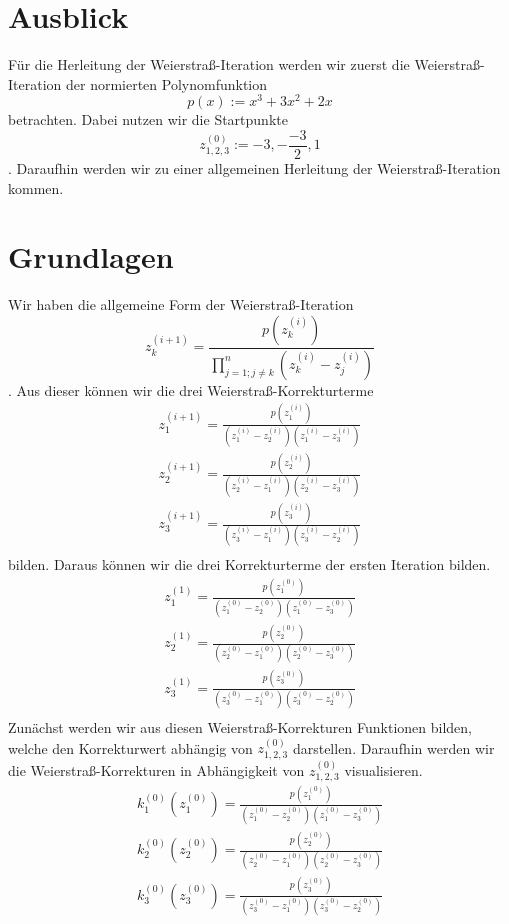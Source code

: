 \documentclass[12pt]{article}
\begin{document}
\section*{Ausblick}
Für die Herleitung der Weierstraß-Iteration werden wir zuerst die Weierstraß-Iteration der normierten Polynomfunktion
\begin{equation}
  p(x) := x^3+3x^2+2x
\end{equation}
betrachten. Dabei nutzen wir die Startpunkte
\begin{equation}
  z^{(0)}_{1,2,3} := -3, -\frac{-3}{2}, 1
\end{equation}
. Daraufhin werden wir zu einer allgemeinen Herleitung der Weierstraß-Iteration kommen.

\section*{Grundlagen}
Wir haben die allgemeine Form der Weierstraß-Iteration
\begin{equation}
  z_k^{(i+1)} = \frac{p(z_{k}^{(i)})}{\prod_{j=1;j\neq k}^{n}(z_{k}^{(i)}-z_j^{(i)})}
\end{equation}
. Aus dieser können wir die drei Weierstraß-Korrekturterme
\begin{align*}
  z_1^{(i+1)} = \frac{p(z_1^{(i)})}{(z_1^{(i)}-z_2^{(i)})(z_1^{(i)}-z_3^{(i)})}\\
  z_2^{(i+1)} = \frac{p(z_2^{(i)})}{(z_2^{(i)}-z_1^{(i)})(z_2^{(i)}-z_3^{(i)})}\\
  z_3^{(i+1)} = \frac{p(z_3^{(i)})}{(z_3^{(i)}-z_1^{(i)})(z_3^{(i)}-z_2^{(i)})}\\
\end{align*}
bilden. Daraus können wir die drei Korrekturterme der ersten Iteration bilden.
\begin{align*}
  z_1^{(1)} = \frac{p(z_1^{(0)})}{(z_1^{(0)}-z_2^{(0)})(z_1^{(0)}-z_3^{(0)})}\\
  z_2^{(1)} = \frac{p(z_2^{(0)})}{(z_2^{(0)}-z_1^{(0)})(z_2^{(0)}-z_3^{(0)})}\\
  z_3^{(1)} = \frac{p(z_3^{(0)})}{(z_3^{(0)}-z_1^{(0)})(z_3^{(0)}-z_2^{(0)})}\\
\end{align*}
Zunächst werden wir aus diesen Weierstraß-Korrekturen Funktionen bilden, welche den Korrekturwert abhängig von $z_{1,2,3}^{(0)}$ darstellen. Daraufhin werden wir die Weierstraß-Korrekturen in Abhängigkeit von $z_{1,2,3}^{(0)}$ visualisieren.
\begin{align*}
  k_1^{(0)}(z_1^{(0)}) = \frac{p(z_1^{(0)})}{(z_1^{(0)}-z_2^{(0)})(z_1^{(0)}-z_3^{(0)})}\\
  k_2^{(0)}(z_2^{(0)}) = \frac{p(z_2^{(0)})}{(z_2^{(0)}-z_1^{(0)})(z_2^{(0)}-z_3^{(0)})}\\
  k_3^{(0)}(z_3^{(0)}) = \frac{p(z_3^{(0)})}{(z_3^{(0)}-z_1^{(0)})(z_3^{(0)}-z_2^{(0)})}\\
\end{align*}
\end{document}

